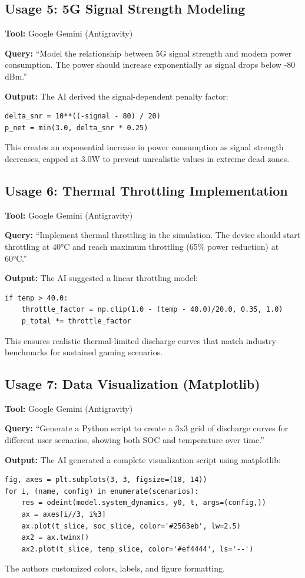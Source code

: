 \documentclass[12pt]{article}
\begin{document}
\newpage

\subsection*{Usage 5: 5G Signal Strength Modeling}
\textbf{Tool:} Google Gemini (Antigravity)

\textbf{Query:} ``Model the relationship between 5G signal strength and modem power consumption. The power should increase exponentially as signal drops below -80 dBm.''

\textbf{Output:} The AI derived the signal-dependent penalty factor:
\begin{verbatim}
delta_snr = 10**((-signal - 80) / 20)
p_net = min(3.0, delta_snr * 0.25)
\end{verbatim}
This creates an exponential increase in power consumption as signal strength decreases, capped at 3.0W to prevent unrealistic values in extreme dead zones.

\subsection*{Usage 6: Thermal Throttling Implementation}
\textbf{Tool:} Google Gemini (Antigravity)

\textbf{Query:} ``Implement thermal throttling in the simulation. The device should start throttling at 40°C and reach maximum throttling (65\% power reduction) at 60°C.''

\textbf{Output:} The AI suggested a linear throttling model:
\begin{verbatim}
if temp > 40.0:
    throttle_factor = np.clip(1.0 - (temp - 40.0)/20.0, 0.35, 1.0)
    p_total *= throttle_factor
\end{verbatim}
This ensures realistic thermal-limited discharge curves that match industry benchmarks for sustained gaming scenarios.

\subsection*{Usage 7: Data Visualization (Matplotlib)}
\textbf{Tool:} Google Gemini (Antigravity)

\textbf{Query:} ``Generate a Python script to create a 3x3 grid of discharge curves for different user scenarios, showing both SOC and temperature over time.''

\textbf{Output:} The AI generated a complete visualization script using matplotlib:
\begin{verbatim}
fig, axes = plt.subplots(3, 3, figsize=(18, 14))
for i, (name, config) in enumerate(scenarios):
    res = odeint(model.system_dynamics, y0, t, args=(config,))
    ax = axes[i//3, i%3]
    ax.plot(t_slice, soc_slice, color='#2563eb', lw=2.5)
    ax2 = ax.twinx()
    ax2.plot(t_slice, temp_slice, color='#ef4444', ls='--')
\end{verbatim}
The authors customized colors, labels, and figure formatting.
\end{document}
